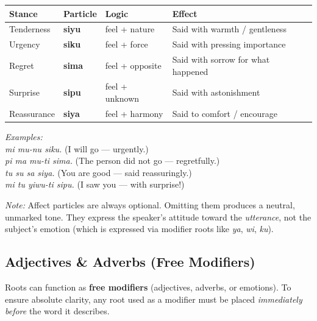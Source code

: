 \documentclass[12pt, a4paper]{article}
\begin{document}
\vspace{0.5em}
\begin{tabular}{@{}llll@{}}
\toprule
\textbf{Stance} & \textbf{Particle} & \textbf{Logic} & \textbf{Effect} \\ \midrule
Tenderness & \textbf{siyu} & feel + nature & Said with warmth / gentleness \\
Urgency & \textbf{siku} & feel + force & Said with pressing importance \\
Regret & \textbf{sima} & feel + opposite & Said with sorrow for what happened \\
Surprise & \textbf{sipu} & feel + unknown & Said with astonishment \\
Reassurance & \textbf{siya} & feel + harmony & Said to comfort / encourage \\
\bottomrule
\end{tabular}

\vspace{0.5em}
\noindent\textit{Examples:} \\
\textit{mi mu-nu siku.} \quad (I will go --- urgently.) \\
\textit{pi ma mu-ti sima.} \quad (The person did not go --- regretfully.) \\
\textit{tu su sa siya.} \quad (You are good --- said reassuringly.) \\
\textit{mi tu yiwu-ti sipu.} \quad (I saw you --- with surprise!)

\vspace{0.3em}
\textit{Note:} Affect particles are always optional. Omitting them produces a neutral, unmarked tone. They express the speaker's attitude toward the \textit{utterance}, not the subject's emotion (which is expressed via modifier roots like \textit{ya}, \textit{wi}, \textit{ku}).

\subsection{Adjectives \& Adverbs (Free Modifiers)}
Roots can function as \textbf{free modifiers} (adjectives, adverbs, or emotions). To ensure absolute clarity, any root used as a modifier must be placed \textit{immediately before} the word it describes.
\end{document}
